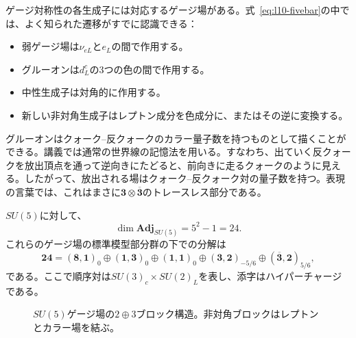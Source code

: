 ゲージ対称性の各生成子には対応するゲージ場がある。式~\eqref{eq:l10-fivebar}の中では、よく知られた遷移がすでに認識できる：
\begin{itemize}
\item 弱ゲージ場は\(\nu_{eL}\)と\(e_L\)の間で作用する。
\item グルーオンは\(d^c_L\)の3つの色の間で作用する。
\item 中性生成子は対角的に作用する。
\item 新しい非対角生成子はレプトン成分を色成分に、またはその逆に変換する。
\end{itemize}

グルーオンはクォーク--反クォークのカラー量子数を持つものとして描くことができる。講義では通常の世界線の記憶法を用いる。すなわち、出ていく反クォークを放出頂点を通って逆向きにたどると、前向きに走るクォークのように見える。したがって、放出される場はクォーク--反クォーク対の量子数を持つ。表現の言葉では、これはまさに\(\mathbf3\otimes\overline{\mathbf3}\)のトレースレス部分である。

\(SU(5)\)に対して、
\begin{equation}
\dim\mathbf{Adj}_{SU(5)}=5^2-1=24.
\end{equation}
これらのゲージ場の標準模型部分群の下での分解は
\begin{equation}
\mathbf{24}
=
(\mathbf8,\mathbf1)_0
\oplus(\mathbf1,\mathbf3)_0
\oplus(\mathbf1,\mathbf1)_0
\oplus(\mathbf3,\mathbf2)_{-5/6}
\oplus(\overline{\mathbf3},\mathbf2)_{5/6},
\label{eq:l10-adjoint-sm}
\end{equation}
である。ここで順序対は\(SU(3)_c\times SU(2)_L\)を表し、添字はハイパーチャージである。


\begin{figure}[htbp]
\centering
{}
\caption{\(SU(5)\)ゲージ場の\(2\oplus3\)ブロック構造。非対角ブロックはレプトンとカラー場を結ぶ。}
\label{fig:l10-gauge-blocks}
\end{figure}

